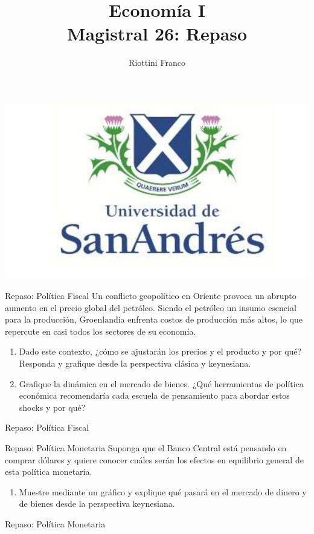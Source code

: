 \documentclass{beamer}
\title[Economía I]{Economía I \vspace{4mm}
\\ Magistral 26: Repaso}
\date{}
\author[Franco Riottini]{Riottini Franco}
\institute[]{Universidad de San Andrés}
\begin{document}
\begin{frame}
\titlepage
\centering

\includegraphics[scale=0.2]{../Figures/logoUDESA.jpg} 
\end{frame}

\begin{frame}{Repaso: Política Fiscal}
    Un conflicto geopolítico en Oriente provoca un abrupto aumento en el precio global del petróleo. Siendo el petróleo un insumo esencial para la producción, Groenlandia enfrenta costos de producción más altos, lo que repercute en casi todos los sectores de su economía.
    \begin{enumerate}
        \item Dado este contexto, ¿cómo se ajustarán los precios y el producto y por qué? Responda y grafique desde la perspectiva clásica y keynesiana.
        \item Grafique la dinámica en el mercado de bienes. ¿Qué herramientas de política económica recomendaría cada escuela de pensamiento para abordar estos shocks y por qué?
    \end{enumerate}
\end{frame}

\begin{frame}{Repaso: Política Fiscal}
    
\end{frame}

\begin{frame}{Repaso: Política Monetaria}
    Suponga que el Banco Central está pensando en comprar dólares y quiere conocer cuáles serán los efectos en equilibrio general de esta política monetaria.
    \begin{enumerate}
        \item  Muestre mediante un gráfico y explique qué pasará en el mercado de dinero y de bienes desde la perspectiva keynesiana.
    \end{enumerate}
\end{frame}
\begin{frame}{Repaso: Política Monetaria}

\end{frame}
\end{document}

